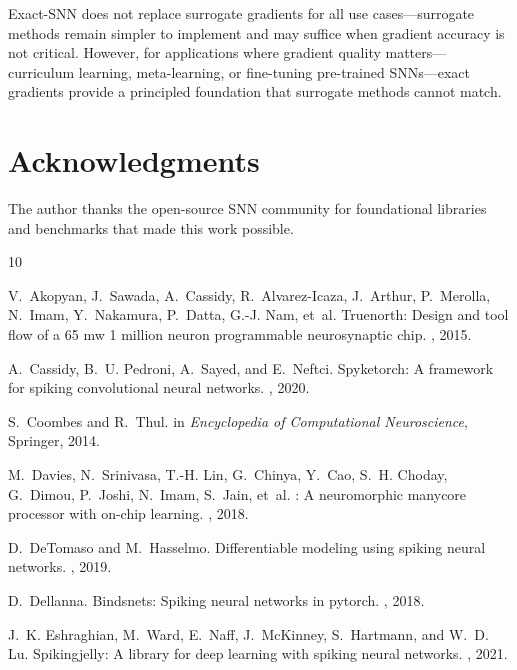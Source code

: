 \documentclass[10pt,twocolumn]{article}
\begin{document}
Exact-SNN does not replace surrogate gradients for all use cases---surrogate methods remain simpler to implement and may suffice when gradient accuracy is not critical. However, for applications where gradient quality matters---curriculum learning, meta-learning, or fine-tuning pre-trained SNNs---exact gradients provide a principled foundation that surrogate methods cannot match.

\section*{Acknowledgments}

The author thanks the open-source SNN community for foundational libraries and benchmarks that made this work possible.


\begin{thebibliography}{10}

V.~Akopyan, J.~Sawada, A.~Cassidy, R.~Alvarez-Icaza, J.~Arthur, P.~Merolla,
  N.~Imam, Y.~Nakamura, P.~Datta, G.-J. Nam, et~al.
\newblock Truenorth: Design and tool flow of a 65 mw 1 million neuron
  programmable neurosynaptic chip.
, 2015.

A.~Cassidy, B.~U. Pedroni, A.~Sayed, and E.~Neftci.
\newblock Spyketorch: A framework for spiking convolutional neural networks.
, 2020.

S.~Coombes and R.~Thul.
 in {\em Encyclopedia of Computational
  Neuroscience}, Springer, 2014.

M.~Davies, N.~Srinivasa, T.-H. Lin, G.~Chinya, Y.~Cao, S.~H. Choday,
  G.~Dimou, P.~Joshi, N.~Imam, S.~Jain, et~al.
: A neuromorphic manycore processor with on-chip learning.
, 2018.

D.~DeTomaso and M.~Hasselmo.
\newblock Differentiable modeling using spiking neural networks.
, 2019.

D.~Dellanna.
\newblock Bindsnets: Spiking neural networks in pytorch.
, 2018.

J.~K. Eshraghian, M.~Ward, E.~Naff, J.~McKinney, S.~Hartmann, and W.~D.
  Lu.
\newblock Spikingjelly: A library for deep learning with spiking neural
  networks.
, 2021.


\end{thebibliography}
\end{document}
